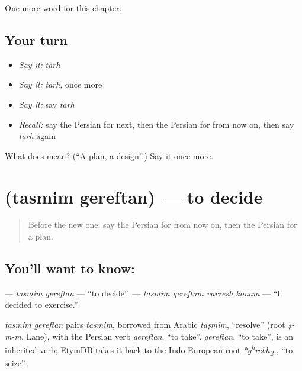 \begin{grammarlens}[title={What you've built}]
One more word for this chapter.
\end{grammarlens}

\subsection*{Your turn}
\begin{itemize}
\raggedright
  \item \emph{Say it:} \emph{tarh}
  \item \emph{Say it:} \emph{tarh}, once more
  \item \emph{Say it:} say \emph{tarh}
  \item \emph{Recall:} say the Persian for next, then the Persian for from now on, then say \emph{tarh} again
\end{itemize}

\begin{tcolorbox}[breakable,colback=teal!4,colframe=teal!35!black,title={Before you move on}]
What does  mean? (\textquotedblleft{}A plan, a design\textquotedblright{}.) Say it once more.
\end{tcolorbox}
\section[\texorpdfstring{\fa{تصمیم} \fa{گرفتن} (tasmim gereftan)}{تصمیم گرفتن (tasmim gereftan)}]{  (tasmim gereftan) — to decide}

\label{lesson:FA-C138-tasmim-gereftan}



\begin{quote}
Before the new one: say the Persian for from now on, then the Persian for a plan.
\end{quote}

\subsection*{You'll want to know:  }
\textbf{ } — \emph{tasmim gereftan} — \textquotedblleft{}to decide\textquotedblright{}. \textbf{   } — \emph{tasmim gereftam varzesh konam} — \textquotedblleft{}I decided to exercise.\textquotedblright{}

\begin{cousinweb}
\emph{tasmim gereftan} pairs \emph{tasmim}, borrowed from Arabic \emph{taṣmīm}, \textquotedblleft{}resolve\textquotedblright{} (root \emph{ṣ-m-m}, Lane), with the Persian verb \emph{gereftan}, \textquotedblleft{}to take\textquotedblright{}. \emph{gereftan}, \textquotedblleft{}to take\textquotedblright{}, is an inherited verb; EtymDB takes it back to the Indo-European root \emph{*g\textsuperscript{h}rebh\textsubscript{2}-}, \textquotedblleft{}to seize\textquotedblright{}.
\end{cousinweb}

